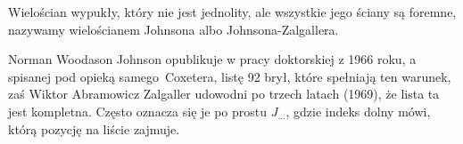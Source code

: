 %

\begin{definition}
    Wielościan wypukły, który nie jest jednolity, ale wszystkie jego ściany są foremne, nazywamy wielościanem Johnsona albo Johnsona-Zalgallera.
\end{definition}

Norman Woodason Johnson \cite{johnson_1966} opublikuje w pracy doktorskiej z 1966 roku, a spisanej pod opieką samego Coxetera, listę 92 brył, które spełniają ten warunek, zaś Wiktor Abramowicz Zalgaller \cite{zalgaller_1969} udowodni po trzech latach (1969), że lista ta jest kompletna.
Często oznacza się je po prostu $J_{\ldots}$, gdzie indeks dolny mówi, którą pozycję na liście zajmuje.




%